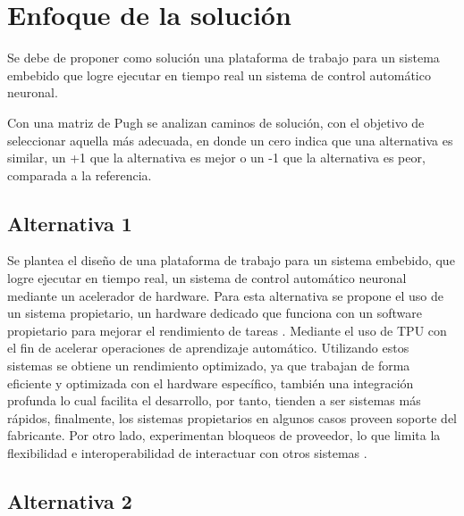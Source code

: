 \documentclass[12pt]{article}
\begin{document}
\section{Enfoque de la solución}

Se debe de proponer como solución una plataforma de trabajo para un sistema embebido que logre ejecutar en tiempo real un sistema de control automático neuronal.


Con una matriz de Pugh se analizan caminos de solución, con el objetivo de seleccionar aquella más adecuada, en donde un cero indica que una alternativa es similar, un +1 que la alternativa es mejor o un -1 que la alternativa es peor, comparada a la referencia.

\subsection{Alternativa 1}


Se plantea el diseño de una plataforma de trabajo para un sistema embebido, que logre ejecutar en tiempo real, un sistema de control automático neuronal mediante un acelerador de hardware. Para esta alternativa se propone el uso de un sistema propietario, un hardware dedicado que funciona con un software propietario para mejorar el rendimiento de tareas\cite{zhao2017hardware} \cite{shi2011vcuda}. Mediante el uso de TPU con el fin de acelerar operaciones de aprendizaje automático. Utilizando estos sistemas se obtiene un rendimiento optimizado, ya que trabajan de forma eficiente y optimizada con el hardware específico, también una integración profunda lo cual facilita el desarrollo, por tanto, tienden a ser sistemas más rápidos, finalmente, los sistemas propietarios en algunos casos proveen soporte del fabricante. Por otro lado, experimentan bloqueos de proveedor, lo que limita la flexibilidad e interoperabilidad de interactuar con otros sistemas \cite{deng2020model} \cite{duato2011enabling}.

\subsection{Alternativa 2}
\end{document}
